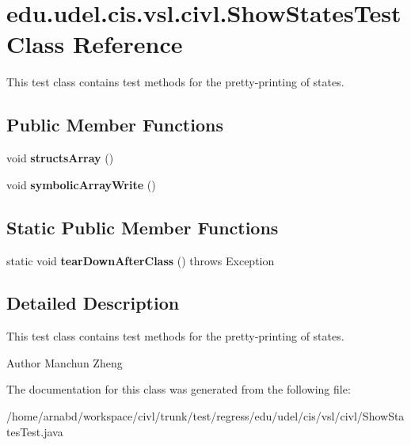 \hypertarget{classedu_1_1udel_1_1cis_1_1vsl_1_1civl_1_1ShowStatesTest}{}\section{edu.\+udel.\+cis.\+vsl.\+civl.\+Show\+States\+Test Class Reference}
\label{classedu_1_1udel_1_1cis_1_1vsl_1_1civl_1_1ShowStatesTest}


This test class contains test methods for the pretty-\/printing of states.  


\subsection*{Public Member Functions}
\begin{DoxyCompactItemize}
\item 
\hypertarget{classedu_1_1udel_1_1cis_1_1vsl_1_1civl_1_1ShowStatesTest_a7df3bfa3fe4933fe1c7514752a07c82b}{}void {\bfseries structs\+Array} ()\label{classedu_1_1udel_1_1cis_1_1vsl_1_1civl_1_1ShowStatesTest_a7df3bfa3fe4933fe1c7514752a07c82b}

\item 
\hypertarget{classedu_1_1udel_1_1cis_1_1vsl_1_1civl_1_1ShowStatesTest_a92554617103d1d7ce34d6772469b1c42}{}void {\bfseries symbolic\+Array\+Write} ()\label{classedu_1_1udel_1_1cis_1_1vsl_1_1civl_1_1ShowStatesTest_a92554617103d1d7ce34d6772469b1c42}

\end{DoxyCompactItemize}
\subsection*{Static Public Member Functions}
\begin{DoxyCompactItemize}
\item 
\hypertarget{classedu_1_1udel_1_1cis_1_1vsl_1_1civl_1_1ShowStatesTest_ae060531bf934bcebb8ca11171ee72c72}{}static void {\bfseries tear\+Down\+After\+Class} ()  throws Exception \label{classedu_1_1udel_1_1cis_1_1vsl_1_1civl_1_1ShowStatesTest_ae060531bf934bcebb8ca11171ee72c72}

\end{DoxyCompactItemize}


\subsection{Detailed Description}
This test class contains test methods for the pretty-\/printing of states. 

\begin{DoxyAuthor}{Author}
Manchun Zheng 
\end{DoxyAuthor}


The documentation for this class was generated from the following file\+:\begin{DoxyCompactItemize}
\item 
/home/arnabd/workspace/civl/trunk/test/regress/edu/udel/cis/vsl/civl/Show\+States\+Test.\+java\end{DoxyCompactItemize}
